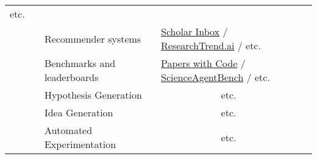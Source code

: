 \begin{table}[]
{\begin{tabular}{p{2.5cm}|p{3.5cm}|p{4.5cm}|p{6cm}}
                            etc.         \\ \cline{3-4}
\cellcolor{layer-2!15} & \raisebox{0.2cm}{\small \textbf{comparison(\$\ref{sec:literature_search})}} &  \small Recommender systems &   \small  ~\href{https://www.scholar-inbox.com/}{Scholar Inbox} /
                            ~\href{https://researchtrend.ai}{ResearchTrend.ai} /
                            etc.     \\ \cline{3-4}
\cellcolor{layer-2!15} && \small  Benchmarks and leaderboards & \small ~\href{https://portal.paperswithcode.com/}{Papers with Code} /
                            ~\href{https://github.com/OSU-NLP-Group/ScienceAgentBench}{ScienceAgentBench} /
                            etc.        \\ \cline{2-4}
\cellcolor{layer-2!15} & \raisebox{-0.3cm}{\small {\textbf{Designing and conducting}}}
 & \small  Hypothesis Generation & \small ~\cite{liu2024literature}
                            ~\cite{yang2024moose}
                            ~\cite{chai2024exploring}
                            ~\cite{qi2024large}
                            ~\cite{wang2023scientific}
                            ~\cite{xiong2024improving}
                            ~\cite{yang2023large}
                            ~\cite{zhou2024hypothesis}
                            etc.       \\ \cline{3-4}
\cellcolor{layer-2!15} & \raisebox{-0.1cm}{\small {\textbf{Experiments; AI-}}}& \small Idea Generation & \small ~\cite{lu2024aiscientistfullyautomated}
                            ~\cite{su2024two}
                            ~\cite{radensky2024scideator}
                            ~\cite{hu2024nova}
                            ~\cite{li2024chain}
                            ~\cite{sandholm2024semantic}
                            ~\cite{pu2024ideasynth}
                            ~\cite{liuproposal}
                            etc.         \\ \cline{3-4}
\cellcolor{layer-2!15} & \raisebox{0.2cm}{\small \textbf{based discovery (\$\ref{sec:experiments})}} &  \small  Automated Experimentation &  \small ~\cite{elsken2019neural}
                            ~\cite{he2021automl}
                            ~\cite{tsai2023automl}
                            ~\cite{zhang2023mlcopilot}
                            ~\cite{huang2024mlagentbench}
                            ~\cite{liu2024drugagent}
                            ~\cite{trirat2024automl}
                            ~\cite{schmidt2024introducing}
                            etc.        \\ \cline{2-4}

\end{tabular}}
\end{table}
